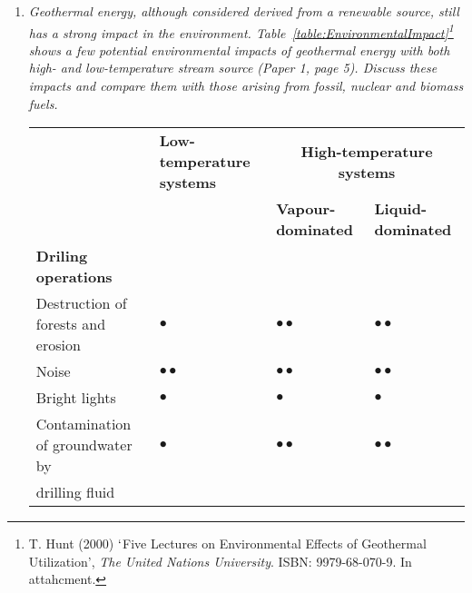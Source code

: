 \documentclass[12pts,a4paper,amsmath,amssymb,floatfix]{article}%
\begin{document}
\begin{enumerate}[label=\bfseries Problem \arabic*:]
\begin{comment}
		=  71.65 * (80 - 60) * 4.1868 * 103    =   6.00 MW

hence saving in coal consumed per day =   6 x 10 6 *  86400  / (24 x 109) /0.8   =  27 tonnes
                                                                                          |                              |         =========
						  seconds in day	efficiency

[ alternatively since 6 MW of 22.22 MW is supplied,  saving is 6 / 22.22 * 100 = 27 tonnes again]

\end{comment}


\item {\it Geothermal energy, although considered derived from a renewable source, still has a strong impact in the environment. Table~\ref{table:EnvironmentalImpact}\footnote{T. Hunt (2000) $\lq$Five Lectures on Environmental Effects of Geothermal Utilization', {\it The United Nations University}. ISBN: 9979-68-070-9. In attahcment.} shows a few potential environmental impacts of geothermal energy with both high- and low-temperature stream source (Paper 1, page 5). Discuss these impacts and compare them with those arising from fossil, nuclear and biomass fuels.}
\begin{table}[h]
\begin{center}
  \begin{tabular}{l | l | l | l }
    \hline\hline
    \multirow{2}{*}{} & {\bf Low-temperature systems} & \multicolumn{2}{c}{\bf High-temperature systems} \\
                      &                               & {\bf Vapour-dominated}       & {\bf Liquid-dominated} \\
    \hline
    \multirow{1}{*}{\bf Driling operations} \\
    \hline
    Destruction of forests and erosion & $\bullet$            & $\bullet\bullet$             & $\bullet\bullet$  \\
    Noise                              & $\bullet\bullet$     & $\bullet\bullet$             & $\bullet\bullet$  \\
    Bright lights                      & $\bullet$            & $\bullet$                    & $\bullet$         \\
    Contamination of groundwater by    & $\bullet$            & $\bullet\bullet$             & $\bullet\bullet$  \\
    \;\;\;drilling fluid               &                      &                              &                   \\

\end{tabular}
\end{center}
\end{table}
\end{enumerate}
\end{document}
